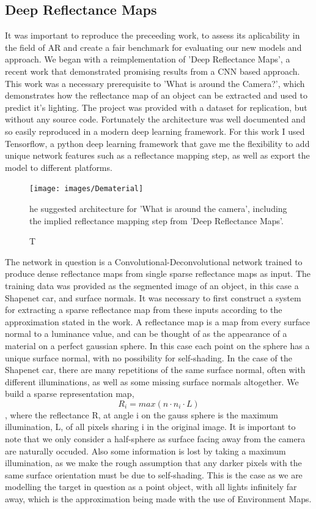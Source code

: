 \documentclass[ %
                    author={Gavin Parker},
                supervisor={Dr. Neill Campbell},
                    degree={MEng},
                     title={Deep Siamese Networks for Illumination Estimation from Stereo Images},
                  subtitle={},
                      type={research},
                      year={2018} ]{dissertation}
\begin{document}
\subsection{Deep Reflectance Maps}
It was important to reproduce the preceeding work, to assess its aplicability in the field of AR and create a fair benchmark for evaluating our new models and approach. We began with a reimplementation of 'Deep Reflectance Maps', a recent work that demonstrated promising results from a CNN based approach. This work was a necessary prerequisite to 'What is around the Camera?', which demonstrates how the reflectance map of an object can be extracted and used to predict it's lighting. The project was provided with a dataset for replication, but without any source code. Fortunately the architecture was well documented and so easily reproduced in a modern deep learning framework. For this work I used Tensorflow, a python deep learning framework that gave me the flexibility to add unique network features such as a reflectance mapping step, as well as export the model to different platforms.
\begin{figure}
\texttt{[image: images/Dematerial]}
\caption The suggested architecture for 'What is around the camera', including the implied reflectance mapping step from 'Deep Reflectance Maps'.
\end{figure}
The network in question is a Convolutional-Deconvolutional network trained to produce dense reflectance maps from single sparse reflectance maps as input. The training data was provided as the segmented image of an object, in this case a Shapenet car, and surface normals. It was necessary to first construct a system for extracting a sparse reflectance map from these inputs according to the approximation stated in the work. A reflectance map is a map from every surface normal to a luminance value, and can be thought of as the appearance of a material on a perfect gaussian sphere. In this case each point on the sphere has a unique surface normal, with no possibility for self-shading. In the case of the Shapenet car, there are many repetitions of the same surface normal, often with different illuminations, as well as some missing surface normals altogether. We build a sparse representation map,
\[ R_i = max(n\cdot n_i \cdot L)\],
where the reflectance R, at angle i on the gauss sphere is the maximum illumination, L, of all pixels sharing i in the original image. It is important to note that we only consider a half-sphere as surface facing away from the camera are naturally occuded. Also some information is lost by taking a maximum illumination, as we make the rough assumption that any darker pixels with the same surface orientation must be due to self-shading. This is the case as we are modelling the target in question as a point object, with all lights infinitely far away, which is the approximation being made with the use of Environment Maps.
\end{document}
